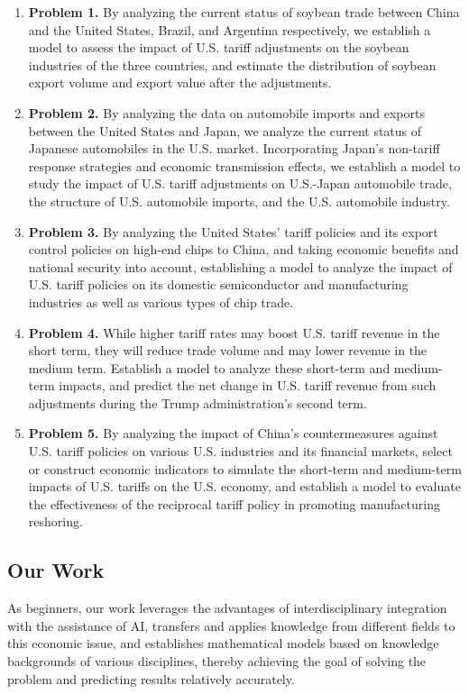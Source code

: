 \documentclass[12pt]{article}
\begin{document}
\begin{enumerate}
    \item \textbf{Problem 1.} By analyzing the current status of soybean trade between China and the United States, Brazil, and Argentina respectively, we establish a model to assess the impact of U.S. tariff adjustments on the soybean industries of the three countries, and estimate the distribution of soybean export volume and export value after the adjustments.
    
    \item \textbf{Problem 2.} By analyzing the data on automobile imports and exports between the United States and Japan, we analyze the current status of Japanese automobiles in the U.S. market. Incorporating Japan's non-tariff response strategies and economic transmission effects, we establish a model to study the impact of U.S. tariff adjustments on U.S.-Japan automobile trade, the structure of U.S. automobile imports, and the U.S. automobile industry.
    
    \item \textbf{Problem 3.} By analyzing the United States' tariff policies and its export control policies on high-end chips to China, and taking economic benefits and national security into account, establishing a model to analyze the impact of U.S. tariff policies on its domestic semiconductor and manufacturing industries as well as various types of chip trade.
    
    \item \textbf{Problem 4.} While higher tariff rates may boost U.S. tariff revenue in the short term, they will reduce trade volume and may lower revenue in the medium term. Establish a model to analyze these short-term and medium-term impacts, and predict the net change in U.S. tariff revenue from such adjustments during the Trump administration's second term.
    
    \item \textbf{Problem 5.} By analyzing the impact of China's countermeasures against U.S. tariff policies on various U.S. industries and its financial markets, select or construct economic indicators to simulate the short-term and medium-term impacts of U.S. tariffs on the U.S. economy, and establish a model to evaluate the effectiveness of the reciprocal tariff policy in promoting manufacturing reshoring.
\end{enumerate}

\subsection{Our Work}
As beginners, our work leverages the advantages of interdisciplinary integration with the assistance of AI, transfers and applies knowledge from different fields to this economic issue, and establishes mathematical models based on knowledge backgrounds of various disciplines, thereby achieving the goal of solving the problem and predicting results relatively accurately.
\end{document}

